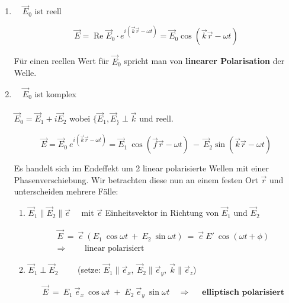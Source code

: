 \begin{enumerate}[label=\textbf{\arabic* .}]

\item $ \quad \vec{E}_0$ ist reell

\begin{equation}
\vec{E} = \operatorname{Re} \vec{E}_0 \cdot e^{i(\vec{k}\vec{r}-\omega t)} = \vec{E}_0 \cos(\vec{k}\vec{r}-\omega t) 
\end{equation}

Für einen reellen Wert für $\vec{E}_0$ spricht man von \textbf{linearer Polarisation} der Welle.

\item $\quad \vec{E}_0$ ist komplex\\
\ \\
$\vec{E}_0 =\vec{E}_1 + i\vec{E}_2$ wobei $\{\vec{E}_1,\vec{E}_\}\perp\vec{k}$ und reell.

\begin{equation*}
\vec{E} = \vec{E}_0 \ e^{i(\vec{k}\vec{r}-\omega t)} = \vec{E}_1 \ \cos(\vec{f}\vec{r}-\omega t) \ - \ \vec{E}_2 \sin (\vec{k}\vec{r} - \omega t)
\end{equation*}

Es handelt sich im Endeffekt um 2 linear polarisierte Wellen mit einer Phasenverschiebung. Wir betrachten diese nun an einem festen Ort $\vec{r}$ und unterscheiden mehrere Fälle:

\begin{enumerate}
\item $\vec{E}_1\parallel\vec{E}_2\parallel\vec{e} \quad $ mit $\vec{e}$ Einheitsvektor in Richtung von $\vec{E}_1$ und $\vec{E}_2$

\begin{align*}
\vec{E} \ = \ \vec{e} \ (E_1 \ \cos \omega t \ + \ E_2 \ \sin \omega t) \  = \  \vec{e}  \ E' \ \cos(\omega t + \phi)\\
\Rightarrow \qquad \text{ linear polarisiert}
\end{align*}

\item $\vec{E}_1\perp\vec{E}_2 \qquad$ (setze: $\vec{E}_1\parallel\vec{e}_x, \  \vec{E}_2\parallel\vec{e}_y, \  \vec{k}\parallel\vec{e}_z$)

\begin{equation*}
\vec{E} \ = \ E_1 \ \vec{e}_x \ \cos \omega t \; + \; E_2 \ \vec{e}_y \ \sin\omega t
\quad\Rightarrow \quad \textbf{ elliptisch polarisiert}
\end{equation*}


\end{enumerate}
\end{enumerate}
